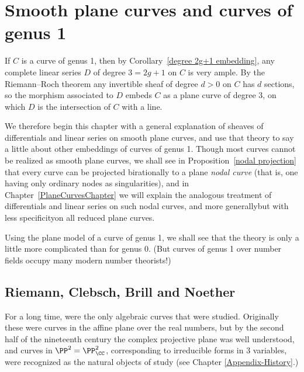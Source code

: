 

\chapter{Smooth plane curves and curves of genus 1}\label{3b}\label{genus 1 chapter}

If $C$ is a 
%
curve of genus 1, then by Corollary~\ref{degree 2g+1 embedding}, any complete linear series $D$ of
degree $3 = 2g+1$ on $C$ is very ample. By the Riemann--Roch theorem any invertible sheaf
of degree $d>0$ on $C$ has $d$ sections, so the morphism associated to $D$ embeds $C$
as a plane curve of degree 3, on which $D$ is the intersection of $C$ with a line. 

We therefore begin this chapter with a general explanation of 
%
sheaves of differentials and linear
series on smooth plane curves, and use that theory to say a little about other embeddings of 
curves of genus 1. Though most curves cannot be realized as smooth plane curves, we shall see
in Proposition~\ref{nodal projection} that every curve can be
projected birationally to a plane 
\textit{nodal curve}
%
(that is, one having only ordinary nodes as singularities), 
and in Chapter~\ref{PlaneCurvesChapter} we will 
explain the analogous treatment of differentials and linear series on
such 
nodal curves, and more
generally\emdash but with less specificity\emdash on all reduced plane curves.

Using the plane model of a curve of genus 1, we shall see that the
theory is only a little more complicated than for genus 0. (But curves
of genus 1 over number fields 
occupy
many modern number theorists!)


\section{Riemann, Clebsch, Brill and Noether}
For a long time, 
%
were the only algebraic curves that were
studied. Originally these were curves in the affine plane over the
real numbers, but by the second half of the 
nineteenth
century the complex
projective plane was well understood, and curves in $\PP^2 =
\PP^2_\CC$, corresponding to irreducible forms in 3 variables, were
recognized as the natural objects of study (see Chapter \ref{Appendix-History}.)

